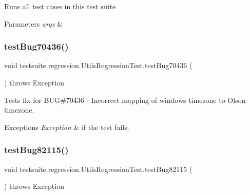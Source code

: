 Runs all test cases in this test suite


\begin{DoxyParams}{Parameters}
{\em args} & \\
\hline
\end{DoxyParams}
\mbox{\label{classtestsuite_1_1regression_1_1_utils_regression_test_a29ccb38cafacb3d15f1610080cdc2d8a}} 
\subsubsection{\texorpdfstring{test\+Bug70436()}{testBug70436()}}
{\footnotesize\ttfamily void testsuite.\+regression.\+Utils\+Regression\+Test.\+test\+Bug70436 (\begin{DoxyParamCaption}{ }\end{DoxyParamCaption}) throws Exception}

Tests fix for B\+UG\#70436 -\/ Incorrect mapping of windows timezone to Olson timezone.


\begin{DoxyExceptions}{Exceptions}
{\em Exception} & if the test fails. \\
\hline
\end{DoxyExceptions}
\mbox{\label{classtestsuite_1_1regression_1_1_utils_regression_test_a47cc76ff1bb97ee0755b21950e5387d0}} 
\subsubsection{\texorpdfstring{test\+Bug82115()}{testBug82115()}}
{\footnotesize\ttfamily void testsuite.\+regression.\+Utils\+Regression\+Test.\+test\+Bug82115 (\begin{DoxyParamCaption}{ }\end{DoxyParamCaption}) throws Exception}

